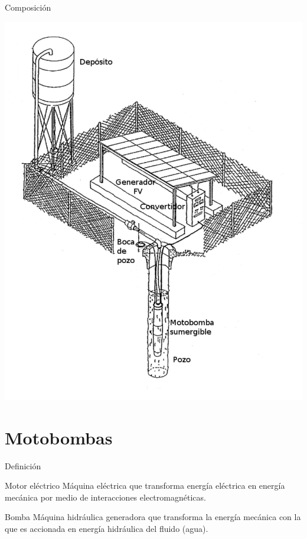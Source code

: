 \documentclass[xcolor={usenames,svgnames,dvipsnames}]{beamer}
\begin{document}
\begin{frame}[label={sec:org9ee7140}]{Composición}
\begin{center}
\includegraphics[height=\textheight]{../figs/EsquemaBombeo_oscar.pdf}
\end{center}
\end{frame}

\section{Motobombas}
\label{sec:orgb5d52d7}

\begin{frame}[label={sec:orgb7b6d83}]{Definición}
\begin{block}{Motor eléctrico}
Máquina eléctrica que \alert{transforma energía eléctrica en energía mecánica} por medio de interacciones electromagnéticas.
\end{block}

\begin{block}{Bomba}
\alert{Máquina hidráulica} generadora que \alert{transforma la energía mecánica} con la que es accionada \alert{en energía hidráulica del fluido} (agua).
\end{block}
\end{frame}
\end{document}
